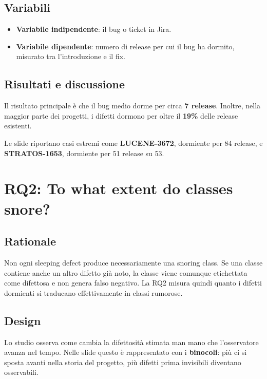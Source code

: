 \subsection{Variabili}

\begin{itemize}
    \item \textbf{Variabile indipendente}: il bug o ticket in Jira.
    \item \textbf{Variabile dipendente}: numero di release per cui il bug ha dormito, misurato tra l'introduzione e il fix.
\end{itemize}

\subsection{Risultati e discussione}

Il risultato principale è che il bug medio dorme per circa \textbf{7 release}. Inoltre, nella maggior parte dei progetti, i difetti dormono per oltre il \textbf{19\%} delle release esistenti.

\begin{notaslide}
Le slide riportano casi estremi come \textbf{LUCENE-3672}, dormiente per 84 release, e \textbf{STRATOS-1653}, dormiente per 51 release su 53.
\end{notaslide}

\section{RQ2: To what extent do classes snore?}

\subsection{Rationale}

Non ogni sleeping defect produce necessariamente una snoring class. Se una classe contiene anche un altro difetto già noto, la classe viene comunque etichettata come difettosa e non genera falso negativo. La RQ2 misura quindi quanto i difetti dormienti si traducano effettivamente in classi rumorose.

\subsection{Design}

Lo studio osserva come cambia la difettosità stimata man mano che l'osservatore avanza nel tempo. Nelle slide questo è rappresentato con i \textbf{binocoli}: più ci si sposta avanti nella storia del progetto, più difetti prima invisibili diventano osservabili.

